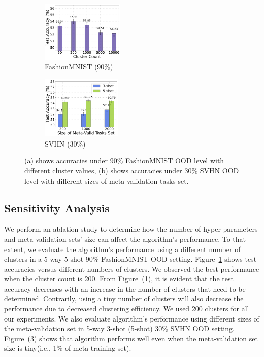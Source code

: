\begin{figure}[!t]
\vspace{-3mm}
    \centering
    \begin{subfigure}[b]{0.23\textwidth}
        \centering
         \includegraphics[height=2.9cm]{figs/bar_plot_with_error_bars.pdf}
         \caption{FashionMNIST (90\%)}
         \label{fig:cluster_ablation}
    \end{subfigure}
    \begin{subfigure}[b]{0.23\textwidth}
        \centering
         \includegraphics[height=3cm]{figs/bar_plot_valid_tasks_size.pdf}    
         \caption{SVHN (30\%)}
         \label{fig:validation_set}
    \end{subfigure}
    \vspace{-3mm}
    \caption{(a) shows accuracies under 90\% FashionMNIST OOD level with different cluster values, (b) shows accuracies under 30\% SVHN OOD level with different sizes of meta-validation tasks set.}
\end{figure}

\subsection{Sensitivity Analysis}
We perform an ablation study to determine how the number of hyper-parameters and meta-validation sets' size can affect the \sysname{} algorithm's performance. To that extent, we evaluate the \sysname{} algorithm's performance using a different number of clusters in a 5-way 5-shot 90\% FashionMNIST OOD setting. Figure~\ref{fig:cluster_ablation} shows test accuracies versus different numbers of clusters. We observed the best performance when the cluster count is 200. From Figure~(\ref{fig:cluster_ablation}), it is evident that the test accuracy decreases with an increase in the number of clusters that need to be determined. Contrarily, using a tiny number of clusters will also decrease the performance due to decreased clustering efficiency. We used 200 clusters for all our experiments. We also evaluate \sysname{} algorithm's performance using different sizes of the meta-validation set in 5-way 3-shot (5-shot) 30\% SVHN OOD setting. Figure~(\ref{fig:validation_set}) shows that \sysname{} algorithm performs well even when the meta-validation set size is tiny(i.e., 1\% of meta-training set).